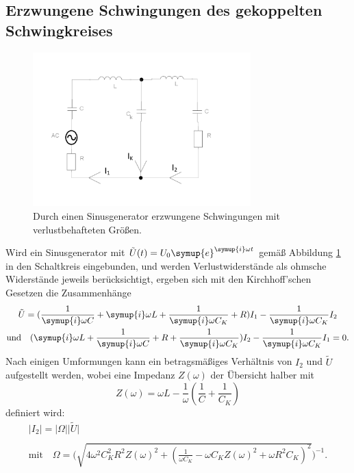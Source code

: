 \subsection{Erzwungene Schwingungen des gekoppelten Schwingkreises}
\begin{figure}
    \centering
    \includegraphics[width=0.75\textwidth]{plots/gekop_schw_kreis1.pdf}
    \caption{Durch einen Sinusgenerator erzwungene Schwingungen mit verlustbehafteten Größen.}
    \label{fig:gezwung-sinus}
\end{figure}
Wird ein Sinusgenerator mit ${\tilde{U}(t)=U_0 \symup{e}^{\symup{i}\omega t}}$ gemäß Abbildung \ref{fig:gezwung-sinus} in den Schaltkreis 
eingebunden, und werden Verlustwiderstände als ohmsche Widerstände jeweils berücksichtigt, ergeben sich mit den Kirchhoff'schen 
Gesetzen die Zusammenhänge 
\begin{gather}
    \tilde{U}=(\frac{1}{\symup{i}\omega C} +  \symup{i} \omega L + \frac{1}{\symup{i}\omega C_K} + R)I_1 - \frac{1}{\symup{i}\omega C_K} I_2 \\
    \text{und} \quad (\symup{i}\omega L + \frac{1}{\symup{i}\omega C} + R+ \frac{1}{\symup{i}\omega C_K}) I_2 - \frac{1}{\symup{i}\omega C_K}I_1 =0 \text{.}
\end{gather}
Nach einigen Umformungen kann ein betragsmäßiges Verhältnis von $I_2$ und $\tilde{U}$ aufgestellt werden, wobei eine Impedanz ${Z(\omega)}$ 
der Übersicht halber mit 
\begin{equation*}
    Z(\omega) = \omega L - \frac{1}{\omega} (\frac{1}{C} + \frac{1}{C_K})    
\end{equation*}
definiert wird:
\begin{gather}
    \lvert I_2 \rvert = \lvert \Omega \rvert \lvert \tilde{U} \rvert \\  \\
    \text{mit} \quad \Omega = \Biggl(\sqrt{4 \omega ^2 C_K^2 R^2 Z(\omega)^2 + (\frac{1}{\omega C_K} - \omega C_K Z(\omega)^2 + \omega R^2 C_K)^2 }\Biggr)^{-1} .
\end{gather}

